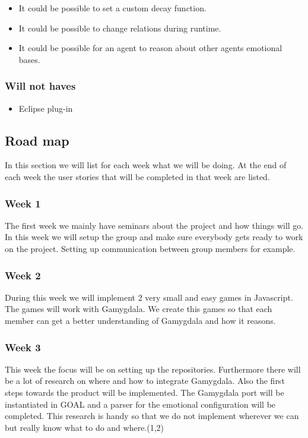 \documentclass[]{article}
\begin{document}
\begin{itemize}
	\item It could be possible to set a custom decay function.
	\item It could be possible to change relations during runtime.
	
	\item It could be possible for an agent to reason about other agents emotional bases.
\end{itemize}

\subsubsection*{Will not haves}
\begin{itemize}
	\item Eclipse plug-in
\end{itemize}

\subsection{Road map}
In this section we will list for each week what we will be doing. At the end of each week the user stories that will be completed in that week are listed.
\subsubsection*{Week 1}
The first week we mainly have seminars about the project and how things will go. In this week we will setup the group and make sure everybody gets ready to work on the project. Setting up communication between group members for example.

\subsubsection*{Week 2}
During this week we will implement 2 very small and easy games in Javascript. The games will work with Gamygdala. We create this games so that each member can get a better understanding of Gamygdala and how it reasons.

\subsubsection*{Week 3}
This week the focus will be on setting up the repositories. Furthermore there will be a lot of research on where and how to integrate Gamygdala. Also the first steps towards the product will be implemented. The Gamygdala port will be instantiated in GOAL and a parser for the emotional configuration will be completed. This research is handy so that we do not implement wherever we can but really know what to do and where.(1,2)
\end{document}
